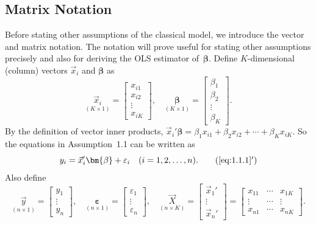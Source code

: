 \subsection*{Matrix Notation}

Before stating other assumptions of the classical model, we introduce the vector and
matrix notation.  The notation will prove useful for stating other assumptions precisely
and also for deriving the OLS estimator of~$\bm{\beta}$.  Define $K$-dimensional (column)
vectors $\vec{x}_i$ and $\bm{\beta}$ as
\begin{equation}
  \underset{(K \times 1)}{\vec{x}_i}
  = \begin{bmatrix} x_{i1} \\ x_{i2} \\ \vdots \\ x_{iK} \end{bmatrix}, \quad
  \underset{(K \times 1)}{\bm{\beta}}
  = \begin{bmatrix} \beta_1 \\ \beta_2 \\ \vdots \\ \beta_K \end{bmatrix}.
  \label{eq:1.1.5}
\end{equation}
By the definition of vector inner products,
$\vec{x}_i'\bm{\beta} = \beta_1 x_{i1} + \beta_2 x_{i2} + \cdots + \beta_K x_{iK}$.
So the equations in Assumption~1.1 can be written as
\begin{equation}
  y_i = \vec{x}_i'\bm{\beta} + \varepsilon_i \quad (i = 1, 2, \ldots, n).
  \tag{\ref{eq:1.1.1}$'$}
  \label{eq:1.1.1p}
\end{equation}
Also define
\begin{equation}
  \underset{(n \times 1)}{\vec{y}}
  = \begin{bmatrix} y_1 \\ \vdots \\ y_n \end{bmatrix}, \quad
  \underset{(n \times 1)}{\bm{\varepsilon}}
  = \begin{bmatrix} \varepsilon_1 \\ \vdots \\ \varepsilon_n \end{bmatrix}, \quad
  \underset{(n \times K)}{\vec{X}}
  = \begin{bmatrix} \vec{x}_1' \\ \vdots \\ \vec{x}_n' \end{bmatrix}
  = \begin{bmatrix}
      x_{11} & \cdots & x_{1K} \\
      \vdots & \cdots & \vdots \\
      x_{n1} & \cdots & x_{nK}
    \end{bmatrix}.
  \label{eq:1.1.6}
\end{equation}
